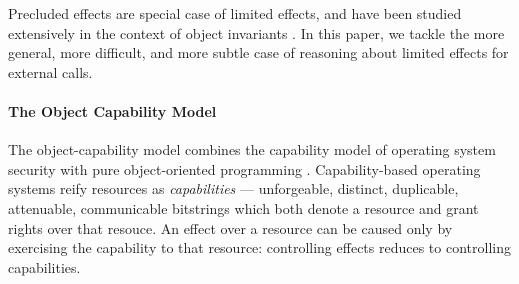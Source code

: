  \vspace{.1cm}
 
\noindent
Precluded effects are special case of limited effects,
and have been studied extensively in the context of object invariants   \cite{staticsfull,DrossoFrancaMuellerSummers08,BarDelFahLeiSch04,objInvars,MuellerPoetzsch-HeffterLeavens06}.
In this paper, we tackle the more general, more difficult, and more subtle case of reasoning about limited effects for external calls.
  
 


 
 
\paragraph{The Object Capability Model}


The object-capability model combines the capability model
of operating system security \cite{levy:capabilities,CAP}
with pure object-oriented programming
\cite{selfpower,selfexp95,agha_actors_1987}.  Capability-based
operating systems reify resources
as \textit{capabilities} ---
unforgeable, distinct, duplicable, attenuable, communicable bitstrings
which both denote a resource and grant rights over that resouce.
An effect over a resource can be caused only by exercising the capability to that resource:
controlling effects reduces to controlling capabilities.


